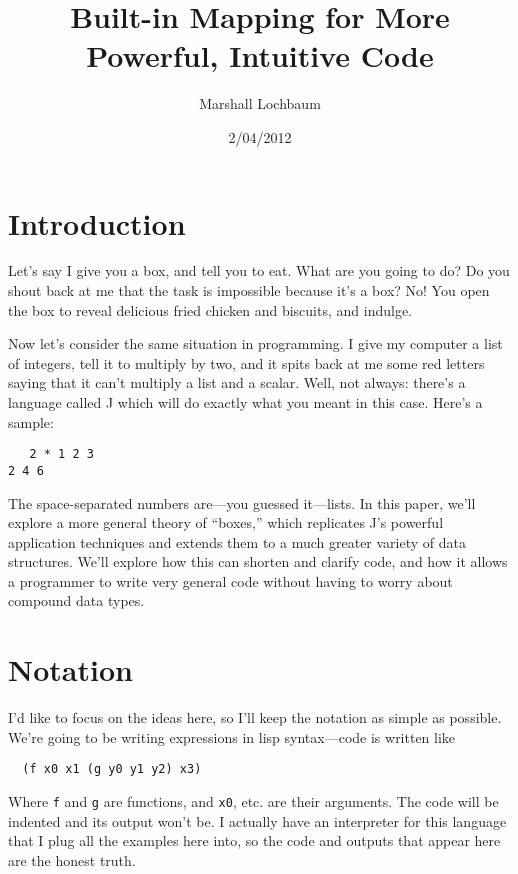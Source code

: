 \documentclass{article}
\newcommand{\code}[1]{\lstinline`#1`}
\begin{document}
\title{Built-in Mapping for More Powerful, Intuitive Code}
\author{Marshall Lochbaum}
\date{2/04/2012}
\maketitle

\section{Introduction}
Let's say I give you a box, and tell you to eat. What are you going to do?  Do you shout back at me that the task is impossible because it's a box? No!  You open the box to reveal delicious fried chicken and biscuits, and indulge.

Now let's consider the same situation in programming. I give my computer a list of integers, tell it to multiply by two, and it spits back at me some red letters saying that it can't multiply a list and a scalar. Well, not always: there's a language called J which will do exactly what you meant in this case. Here's a sample:
\begin{lstlisting}
   2 * 1 2 3
2 4 6
\end{lstlisting}
The space-separated numbers are---you guessed it---lists. In this paper, we'll explore a more general theory of ``boxes,'' which replicates J's powerful application techniques and extends them to a much greater variety of data structures. We'll explore how this can shorten and clarify code, and how it allows a programmer to write very general code without having to worry about compound data types.

\section{Notation}
I'd like to focus on the ideas here, so I'll keep the notation as simple as possible. We're going to be writing expressions in lisp syntax---code is written like
\begin{lstlisting}
  (f x0 x1 (g y0 y1 y2) x3)
\end{lstlisting}
Where \code{f} and \code{g} are functions, and \code{x0}, etc. are their arguments. The code will be indented and its output won't be. I actually have an interpreter for this language that I plug all the examples here into, so the code and outputs that appear here are the honest truth.
\vspace{\baselineskip}
\end{document}
